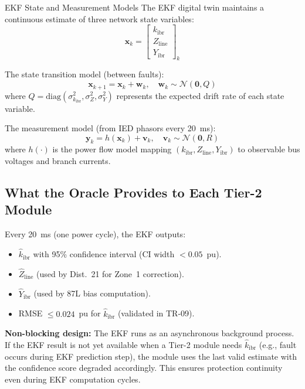 \documentclass[12pt,a4paper]{article}
\newcommand{\kibr}{k_\mathrm{ibr}}
\newcommand{\kibrhat}{\hat{k}_\mathrm{ibr}}
\begin{document}
\begin{formulabox}{EKF State and Measurement Models}
The EKF digital twin maintains a continuous estimate of three network
state variables:
\begin{equation}
  \mathbf{x}_k = \begin{bmatrix} \kibr \\ Z_\mathrm{line} \\ Y_\mathrm{ibr} \end{bmatrix}_k
  \label{eq:ekf_state}
\end{equation}

The state transition model (between faults):
\begin{equation}
  \mathbf{x}_{k+1} = \mathbf{x}_k + \mathbf{w}_k, \quad
  \mathbf{w}_k \sim \mathcal{N}(\mathbf{0}, Q)
  \label{eq:ekf_process}
\end{equation}
where $Q = \mathrm{diag}(\sigma_{k_\mathrm{ibr}}^2, \sigma_Z^2, \sigma_Y^2)$
represents the expected drift rate of each state variable.

The measurement model (from IED phasors every 20~ms):
\begin{equation}
  \mathbf{y}_k = h(\mathbf{x}_k) + \mathbf{v}_k, \quad
  \mathbf{v}_k \sim \mathcal{N}(\mathbf{0}, R)
  \label{eq:ekf_measurement}
\end{equation}
where $h(\cdot)$ is the power flow model mapping $(\kibr, Z_\mathrm{line},
Y_\mathrm{ibr})$ to observable bus voltages and branch currents.
\end{formulabox}

\subsection{What the Oracle Provides to Each Tier-2 Module}

Every 20~ms (one power cycle), the EKF outputs:
\begin{itemize}[nosep]
  \item $\kibrhat$ with 95\% confidence interval (CI width $< 0.05$~pu).
  \item $\hat{Z}_\mathrm{line}$ (used by Dist.~21 for Zone~1 correction).
  \item $\hat{Y}_\mathrm{ibr}$ (used by 87L bias computation).
  \item RMSE $\leq 0.024$~pu for $\kibrhat$ (validated in TR-09).
\end{itemize}

\noindent\textbf{Non-blocking design:} The EKF runs as an asynchronous background
process.  If the EKF result is not yet available when a Tier-2 module needs
$\kibrhat$ (e.g., fault occurs during EKF prediction step), the module uses
the last valid estimate with the confidence score degraded accordingly.  This
ensures protection continuity even during EKF computation cycles.
\end{document}
